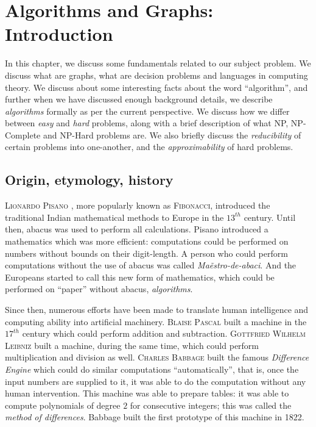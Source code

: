 \chapter{Algorithms and Graphs: Introduction}\label{chapter:introduction}

In this chapter, we discuss some fundamentals related to our subject problem. We discuss what are graphs, what are decision problems and languages in computing theory. We discuss about some interesting facts about the word ``algorithm'', and further when we have discussed enough background details, we describe \textit{algorithms} formally as per the current perspective. We discuss how we differ between \textit{easy} and \textit{hard} problems, along with a brief description of what NP, NP-Complete and NP-Hard problems are. We also briefly discuss the \textit{reducibility} of certain problems into one-another, and the \textit{approximability} of hard problems.

\section{Origin, etymology, history}

\textsc{Lionardo Pisano} \cite{Sigler2002}, more popularly known as \textsc{Fibonacci}, introduced the traditional Indian mathematical methods to Europe in the $13^{th}$ century. Until then, abacus was used to perform all calculations. Pisano introduced a mathematics which was more efficient: computations could be performed on numbers without bounds on their digit-length. A person who could perform computations without the use of abacus was called \textit{Ma\~estro-de-abaci}. And the Europeans started to call this new form of mathematics, which could be performed on ``paper'' without abacus, \textit{algorithms}.

Since then, numerous efforts have been made to translate human intelligence and computing ability into artificial machinery. \textsc{Blaise Pascal} \cite{Dasgupta2014} built a machine in the $17^{th}$ century which could perform addition and subtraction. \textsc{Gottfried Wilhelm Leibniz} built a machine, during the same time, which could perform multiplication and division as well. \textsc{Charles Babbage} built the famous \textit{Difference Engine} which could do similar computations ``automatically'', that is, once the input numbers are supplied to it, it was able to do the computation without any human intervention. This machine was able to prepare tables: it was able to compute polynomials of degree $2$ for consecutive integers; this was called the \textit{method of differences}. Babbage built the first prototype of this machine in 1822.

